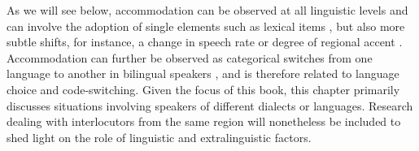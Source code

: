 \documentclass[output=paper,
modfonts
]{langscibook}
\begin{document}
As we will see below, accommodation can be observed at all linguistic levels and can involve the adoption of single elements such as lexical items \citep{brennan_conceptual_1996}, but also more subtle shifts, for instance, a change in speech rate \citep{putman_conception_1984} or degree of regional accent \citep{bourhis_language_1977}. Accommodation can further be observed as categorical switches from one language to another in bilingual speakers \citep{giles_towards_1973}, and is therefore related to language choice and code-switching. %
Given the focus of this book, this chapter primarily discusses situations involving speakers of different dialects or languages. Research dealing with interlocutors from the same region will nonetheless be included to shed light on the role of linguistic and extralinguistic factors.
% 
% 
% 
%
% 
%
% 
% 
% 
% 
% 
% 
\end{document}
